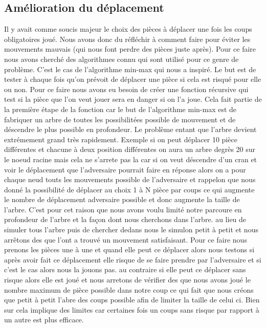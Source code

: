 \documentclass[11pt]{article} %
\begin{document}
\subsection{Amélioration du déplacement}
Il y avait comme soucis majeur le choix des pièces à déplacer une fois les coups obligatoires joué. Nous avons donc du réfléchir à comment faire pour éviter les mouvements mauvais (qui nous font perdre des pièces juste après). Pour ce faire nous avons cherché des algorithmes connu qui sont utilisé pour ce genre de problème. C'est le cas de l'algorithme min-max qui nous a inspiré. Le but est de tester à chaque fois qu'on prévoit de déplacer une pièce si cela est risqué pour elle ou non. Pour ce faire nous avons eu besoin de créer une fonction récursive qui test si la pièce que l'on veut jouer sera en danger si on l'a joue. Cela fait partie de la première étape de la fonction car le but de l'algorithme min-max est de fabriquer un arbre de toutes les possibilitées possible de mouvement et de déscendre le plus possible en profondeur. Le problème entant que l'arbre devient extrémement grand très rapidement. Exemple si on peut déplacer 10 pièce différentes et chacune à deux position différentes on aura un arbre degrès 20 sur le noeud racine mais cela ne s'arrete pas la car si on veut déscendre d'un cran et voir le déplacement que l'adversaire pourrait faire en réponse alors on a pour chaque neud touts les mouvements possible de l'adversaire et rappelon que nous donné la possibilité de déplacer au choix 1 à N pièce par coups ce qui augmente le nombre de déplacement adversaire possible et donc augmente la taille de l'arbre. C'est pour cet raison que nous avons voulu limité notre parcoure en profondeur de l'arbre et la façon dont nous cherchons dans l'arbre. au lieu de simuler tous l'arbre puis de chercher dedans nous le simulon petit à petit et nous arrêtons des que l'ont a trouvé un mouvement satisfaisant. Pour ce faire nous prenons les pièces une à une et quand elle peut ce déplacer alors nous testons si après avoir fait ce déplacement elle risque de se faire prendre par l'adversaire et si c'est le cas alors nous la jouons pas. au contraire si elle peut ce déplacer sans risque alors elle est joué et nous arretons de vérifier des que nous avons joué le nombre maximum de pièce possible dans notre coup ce qui fait que nous créons que petit à petit l'abre des coups possible afin de limiter la taille de celui ci. Bien sur cela implique des limites car certaines fois un coups sans risque par rapport à un autre est plus efficace.
\end{document}
